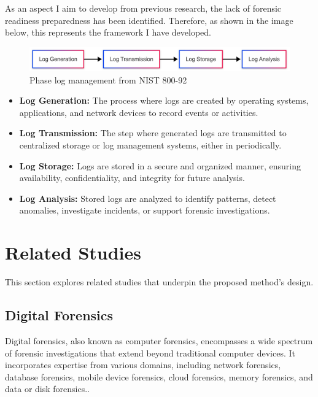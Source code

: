 As an aspect I aim to develop from previous research, the lack of forensic readiness preparedness has been identified. Therefore, as shown in the image below, this represents the framework I have developed.

\begin{figure}[H] 
    \centering
    \includegraphics[width=14cm]{figure/log-management-nist-800-92-original.png}
    \caption{ Phase log management from NIST 800-92}
    \label{fig:nist-log-management}
\end{figure}


\begin{itemize}
    \item \textbf{Log Generation:} The process where logs are created by operating systems, applications, and network devices to record events or activities.
    \item \textbf{Log Transmission:} The step where generated logs are transmitted to centralized storage or log management systems, either in periodically.
    \item \textbf{Log Storage:} Logs are stored in a secure and organized manner, ensuring availability, confidentiality, and integrity for future analysis.
    \item \textbf{Log Analysis:} Stored logs are analyzed to identify patterns, detect anomalies, investigate incidents, or support forensic investigations.
\end{itemize}


\section{Related Studies}
This section explores related studies that underpin the proposed method's design.

\subsection{Digital Forensics}  Digital forensics, also known as computer forensics, encompasses a wide spectrum of forensic investigations that extend beyond traditional computer devices. It incorporates expertise from various domains, including network forensics, database forensics, mobile device forensics, cloud forensics, memory forensics, and data or disk forensics.\cite{paul2019analysisdf}.

